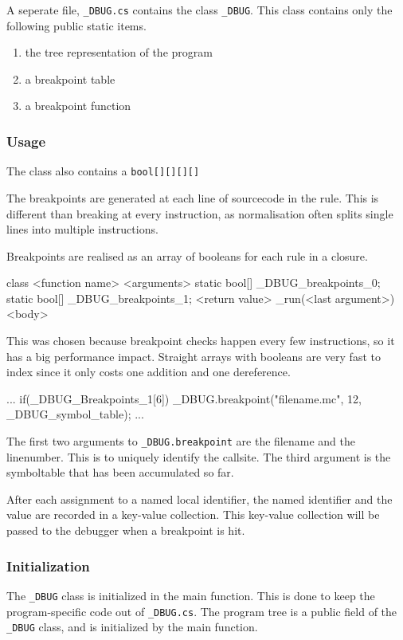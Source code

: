 A seperate file, \verb|_DBUG.cs| contains the class \verb|_DBUG|.
This class contains only the following public static items.

\begin{enumerate}
    \item the tree representation of the program
    \item a breakpoint table
    \item a breakpoint function
\end{enumerate}

\subsubsection{Usage}

The class also contains a \verb|bool[][][][]| 

The breakpoints are generated at each line of sourcecode in the rule.
This is different than breaking at every instruction, as normalisation often splits single lines into multiple instructions.

Breakpoints are realised as an array of booleans for each rule in a closure.

\begin{code}
    class <function name>{
        <arguments>
        static bool[] _DBUG_breakpoints_0;
        static bool[] _DBUG_breakpoints_1;
        <return value> _run(<last argument>){
            <body> 
        }
    }
\end{code}

This was chosen because breakpoint checks happen every few instructions, so it has a big performance impact.
Straight arrays with booleans are very fast to index since it only costs one addition and one dereference.

\begin{code}
    ...
    if(_DBUG_Breakpoints_1[6]){
        _DBUG.breakpoint("filename.mc", 12, 
                         _DBUG_symbol_table);
    }
    ...
\end{code}

The first two arguments to \verb|_DBUG.breakpoint| are the filename and the linenumber.
This is to uniquely identify the callsite.
The third argument is the symboltable that has been accumulated so far.

After each assignment to a named local identifier, the named identifier and the value are recorded in a key-value collection. 
This key-value collection will be passed to the debugger when a breakpoint is hit.

\subsubsection{Initialization}
The \verb|_DBUG| class is initialized in the main function.
This is done to keep the program-specific code out of \verb|_DBUG.cs|.
The program tree is a public field of the \verb|_DBUG| class, and is initialized by the main function.

